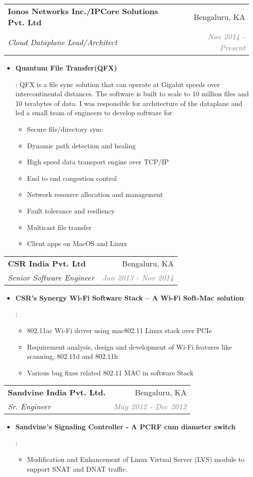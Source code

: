 \documentclass[letterpaper,11pt]{article}
\makeatletter
\newcommand{\resumeItem}[2]{
  \item\small{
    \textbf{#1}{: #2 \vspace{-2pt}}
  }
}
\newcommand{\resumeSubheading}[4]{
  \vspace{-1pt}\item
    \begin{tabular*}{0.97\textwidth}[t]{l@{\extracolsep{\fill}}r}
      \textbf{#1} & #2 \\
      \textit{\small#3} & \textit{\small #4} \\
    \end{tabular*}\vspace{-5pt}
}
\newcommand{\resumeItemListStart}{\begin{itemize}}
\newcommand{\resumeItemListEnd}{\end{itemize}\vspace{-5pt}}
\makeatother
\begin{document}
    \resumeSubheading
      {Ionos Networks Inc./IPCore Solutions Pvt. Ltd}{\textcolor{RED1}{Bengaluru, KA}}
      {Cloud Dataplane Lead/Architect}{\textcolor{GRAY}{Nov 2014 - Present}}
      \resumeItemListStart
        \resumeItem{Quantum File Transfer(QFX)}
          {
           QFX is a file sync solution that can operate at Gigabit speeds over intercontinental distances. The software is built to scale to 10 million files and 10 terabytes of data. I was responsible for architecture of the dataplane and led a small team of engineers to develop software for 
           \begin{itemize}
           \item {Secure file/directory sync}
           \item {Dynamic path detection and healing}
           \item {High speed data transport engine over TCP/IP}
           \item {End to end congestion control}
           \item {Network resource allocation and management}
           \item {Fault tolerance and resiliency}
           \item {Multicast file transfer}
           \item {Client apps on MacOS and Linux}
           \end{itemize}}
      \resumeItemListEnd

    \resumeSubheading
      {CSR India Pvt. Ltd}{\textcolor{RED1}{Bengaluru, KA}}
      {Senior Software Engineer}{\textcolor{GRAY}{Jan 2013 - Nov 2014}}
      \resumeItemListStart
        \resumeItem{CSR’s Synergy Wi-Fi Software Stack – A Wi-Fi Soft-Mac solution}
          {
	          \begin{itemize}
    		      \item {802.11ac Wi-Fi driver using mac802.11 Linux stack over PCIe}
    	    		  \item {Requirement analysis, design and development of Wi-Fi features like scanning, 802.11d and 802.11h}
          	 \item {Various bug fixes related 802.11 MAC in software Stack}          
          	\end{itemize}  
          }
      \resumeItemListEnd

    \resumeSubheading
      {Sandvine India Pvt. Ltd.}{\textcolor{RED1}{Bengaluru, KA}}
      {Sr. Engineer}{\textcolor{GRAY}{May 2012 - Dec 2012}}
      \resumeItemListStart
        \resumeItem{Sandvine’s Signaling Controller - A PCRF cum diameter switch}
          {
          \begin{itemize}
          \item {Modification and Enhancement of Linux Virtual Server (LVS) module to support SNAT and DNAT traffic.}
          \end{itemize}
          }
      \resumeItemListEnd
\end{document}
